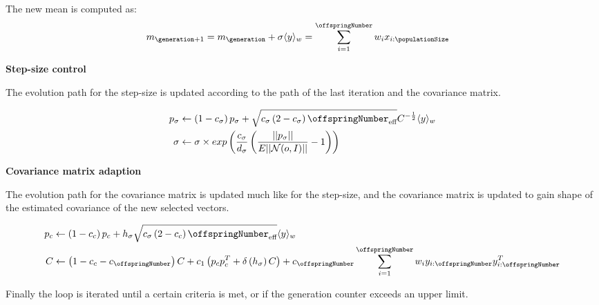 The new mean is computed as:
\begin{align*}
m_{\generation+1} &= m_{\generation} + \sigma \langle y \rangle_{w} = \sum^{\offspringNumber}_{i = 1} w_{i}x_{i:\populationSize}
\end{align*}

\textbf{Step-size control}

The evolution path for the step-size is updated according 
to the path of the last iteration and the covariance matrix.

\begin{align*}
p_{\sigma} &\leftarrow \left( 1 - c_{\sigma} \right) p_{\sigma} + \sqrt{c_{\sigma} \left( 2 - c_{\sigma} \right) \offspringNumber_{\text{eff}}} C^{- \frac{1}{2}} \langle y \rangle_{w}\\
\sigma &\leftarrow \sigma \times exp \left( \frac{c_{\sigma}}{d_{\sigma}} \left( \frac{||p_{\sigma}||}{E|| \mathcal{N}(o, I) ||} - 1 \right) \right)
\end{align*}

\textbf{Covariance matrix adaption}

The evolution path for the covariance matrix is updated much like for the step-size, 
and the covariance matrix is updated to gain shape of the estimated covariance 
of the new selected vectors.

\begin{align*}
p_{c} &\leftarrow \left( 1 - c_{c} \right) p_{c} + h_{\sigma} \sqrt{c_{\sigma} \left( 2 - c_{c} \right) \offspringNumber_{\text{eff}}} \langle y \rangle_{w}\\
C &\leftarrow \left( 1 - c_{c} - c_{\offspringNumber} \right) C + c_{1} \left( p_{c} p_{c}^{T} + \delta \left( h_{\sigma} \right) C \right) + c_{\offspringNumber} \sum^{\offspringNumber}_{i = 1} w_{i} y_{i : \offspringNumber} y_{i : \offspringNumber} ^{T}
\end{align*}


Finally the loop is iterated until a certain criteria is met, 
or if the generation counter exceeds an upper limit.




